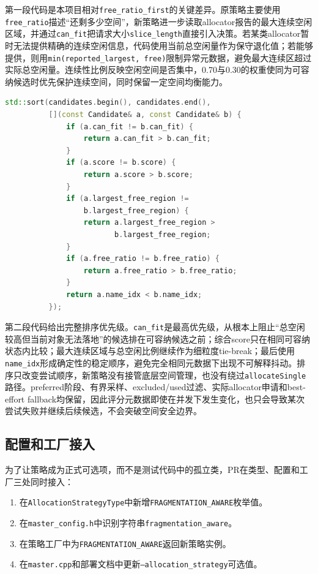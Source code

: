 \documentclass[UTF8,zihao=-4,a4paper]{ctexart}
\newcommand{\artifact}[1]{\texttt{#1}}
\newcommand{\baseline}{\texttt{free\_ratio\_first}}
\begin{document}
第一段代码是本项目相对\baseline{}的关键差异。原策略主要使用\artifact{free\_ratio}描述“还剩多少空间”，新策略进一步读取allocator报告的最大连续空闲区域，并通过\artifact{can\_fit}把请求大小\artifact{slice\_length}直接引入决策。若某类allocator暂时无法提供精确的连续空闲信息，代码使用当前总空闲量作为保守退化值；若能够提供，则用\artifact{min(reported\_largest, free)}限制异常元数据，避免最大连续区超过实际总空闲量。连续性比例反映空闲空间是否集中，0.70与0.30的权重使同为可容纳候选时优先保护连续空间，同时保留一定空间均衡能力。

\begin{lstlisting}[language=C++,caption={候选排序优先级的实际实现}]
std::sort(candidates.begin(), candidates.end(),
          [](const Candidate& a, const Candidate& b) {
              if (a.can_fit != b.can_fit) {
                  return a.can_fit > b.can_fit;
              }
              if (a.score != b.score) {
                  return a.score > b.score;
              }
              if (a.largest_free_region !=
                  b.largest_free_region) {
                  return a.largest_free_region >
                         b.largest_free_region;
              }
              if (a.free_ratio != b.free_ratio) {
                  return a.free_ratio > b.free_ratio;
              }
              return a.name_idx < b.name_idx;
          });
\end{lstlisting}

第二段代码给出完整排序优先级。\artifact{can\_fit}是最高优先级，从根本上阻止“总空闲较高但当前对象无法落地”的候选排在可容纳候选之前；综合score只在相同可容纳状态内比较；最大连续区域与总空闲比例继续作为细粒度tie-break；最后使用\artifact{name\_idx}形成确定性的稳定顺序，避免完全相同元数据下出现不可解释抖动。排序只改变尝试顺序，新策略没有接管底层空间管理，也没有绕过\artifact{allocateSingle}路径。preferred阶段、有界采样、excluded/used过滤、实际allocator申请和best-effort fallback均保留，因此评分元数据即使在并发下发生变化，也只会导致某次尝试失败并继续后续候选，不会突破空间安全边界。

\subsection{配置和工厂接入}

为了让策略成为正式可选项，而不是测试代码中的孤立类，PR在类型、配置和工厂三处同时接入：

\begin{enumerate}
  \item 在\artifact{AllocationStrategyType}中新增\artifact{FRAGMENTATION\_AWARE}枚举值。
  \item 在\artifact{master\_config.h}中识别字符串\artifact{fragmentation\_aware}。
  \item 在策略工厂中为\artifact{FRAGMENTATION\_AWARE}返回新策略实例。
  \item 在\artifact{master.cpp}和部署文档中更新\artifact{--allocation\_strategy}可选值。
\end{enumerate}
\end{document}
